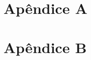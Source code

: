 \documentclass[
	12pt,				%
	openright,			%
	twoside,			%
	a4paper,			%
	english,			%
	spanish,			%
	brazil				%
	]{ufscar}
\begin{document}
%
%


\begin{apendicesenv}


\chapter{Apêndice A}
\label{apendice:a}
%

\chapter{Apêndice B}
\label{apendice:b}
%

\end{apendicesenv}

\printindex
\end{document}
